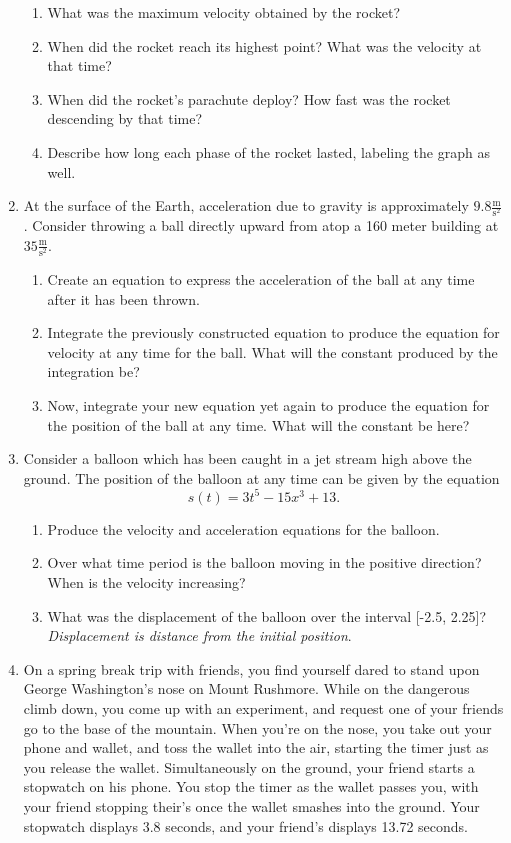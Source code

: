 \documentclass{ximera}
\begin{document}
\begin{enumerate}
\begin{image}
\end{image}
\begin{enumerate}
\item{What was the maximum velocity obtained by the rocket?}
\item{When did the rocket reach its highest point? What was the velocity at that time?}
\item{When did the rocket's parachute deploy? How fast was the rocket descending by that time?}
\item{Describe how long each phase of the rocket lasted, labeling the graph as well.}
\end{enumerate}
\item{At the surface of the Earth, acceleration due to gravity is approximately $9.8 \frac{\text{m}}{\text{s}^2}$. Consider throwing a ball directly upward from atop a 160 meter building at $35 \frac{\text{m}}{\text{s}^2}$.}
\begin{enumerate}
\item{Create an equation to express the acceleration of the ball at any time after it has been thrown.}
\item{Integrate the previously constructed equation to produce the equation for velocity at any time for the ball. What will the constant produced by the integration be?}
\item{Now, integrate your new equation yet again to produce the equation for the position of the ball at any time. What will the constant be here?}
\end{enumerate}
\item{Consider a balloon which has been caught in a jet stream high above the ground. The position of the balloon at any time can be given by the equation $$s(t) = 3t^5-15x^3+13\text{.}$$}
\begin{enumerate}
\item{Produce the velocity and acceleration equations for the balloon.}
\item{Over what time period is the balloon moving in the positive direction? When is the velocity increasing?}
\item{What was the displacement of the balloon over the interval [-2.5, 2.25]? \textit{Displacement is distance from the initial position}.}
\end{enumerate}
\item{On a spring break trip with friends, you find yourself dared to stand upon George Washington's nose on Mount Rushmore. While on the dangerous climb down, you come up with an experiment, and request one of your friends go to the base of the mountain. When you're on the nose, you take out your phone and wallet, and toss the wallet into the air, starting the timer just as you release the wallet. Simultaneously on the ground, your friend starts a stopwatch on his phone. You stop the timer as the wallet passes you, with your friend stopping their's once the wallet smashes into the ground. Your stopwatch displays 3.8 seconds, and your friend's displays 13.72 seconds.}

\end{enumerate}
\end{document}
